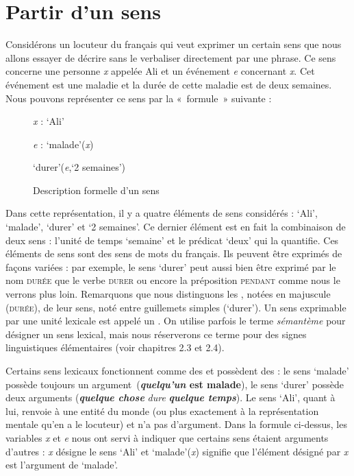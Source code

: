 \section{Partir d’un sens}\label{sec:1.2.2}

Considérons un locuteur du français qui veut exprimer un certain sens que nous allons essayer de décrire sans le verbaliser directement par une phrase. Ce sens concerne une personne \textit{x} appelée Ali et un événement \textit{e} concernant \textit{x}. Cet événement est une maladie et la durée de cette maladie est de deux semaines.  Nous pouvons représenter ce sens par la «~formule~» suivante :

\begin{figure}

\textit{x} : ‘Ali’

\textit{e} : ‘malade’(\textit{x})

‘durer’(\textit{e},‘2 semaines’)

\caption{\label{fig:}Description formelle d’un sens}

\end{figure}

Dans cette représentation, il y a quatre éléments de sens considérés : ‘Ali’, ‘malade’, ‘durer’ et ‘2 semaines’. Ce dernier élément est en fait la combinaison de deux sens : l’unité de temps ‘semaine’ et le prédicat ‘deux’ qui la quantifie. Ces éléments de sens sont des sens de mots du français. Ils peuvent être exprimés de façons variées : par exemple, le sens ‘durer’ peut aussi bien être exprimé par le nom \textsc{durée} que le verbe \textsc{durer} ou encore la préposition \textsc{pendant} comme nous le verrons plus loin. Remarquons que nous distinguons les , notées en majuscule (\textsc{durée}), de leur sens, noté entre guillemets simples (‘durer’). Un sens exprimable par une unité lexicale est appelé un . On utilise parfois le terme \textit{sémantème} pour désigner un sens lexical, mais nous réserverons ce terme pour des signes linguistiques élémentaires (voir chapitres 2.3 et 2.4).

Certains sens lexicaux fonctionnent comme des  et possèdent des  : le sens ‘malade’ possède toujours un argument~(\textbf{\textit{quelqu’un} est malade}), le sens ‘durer’ possède deux arguments (\textbf{\textit{quelque chose}} \textit{dure} \textbf{\textit{quelque temps}}). Le sens ‘Ali’, quant à lui, renvoie à une entité du monde (ou plus exactement à la représentation mentale qu’en a le locuteur) et n’a pas d’argument. Dans la formule ci-dessus, les variables \textit{x} et \textit{e} nous ont servi à indiquer que certains sens étaient arguments d’autres : \textit{x} désigne le sens ‘Ali’ et ‘malade’(\textit{x}) signifie que l’élément désigné par \textit{x} est l’argument de ‘malade’.

